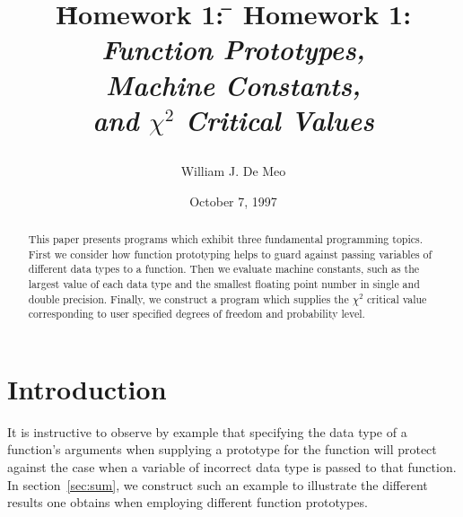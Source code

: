 \documentclass{article}
\begin{document}
\title{
\begin{tabbing}
\=Homework 1: \=\kill 
\>Homework 1: \>\emph{Function Prototypes,}\\
\>\>\emph{Machine Constants,}\\
\>\>\emph{and $\chi^2$ Critical Values}
\end{tabbing}
}
\author{William J. De Meo}
\date{October 7, 1997}
\maketitle

\begin{abstract}
This paper presents programs which exhibit three fundamental 
programming topics.  First we consider how function prototyping 
helps to guard against passing variables of different data types 
to a function.  Then we evaluate 
machine constants, such as the largest value of each data type 
and the smallest floating point number in single and double precision.
Finally, we construct
a program which supplies the $\chi^2$ critical value corresponding
to user specified degrees of freedom and probability level.
\end{abstract}

\section{Introduction}
It is instructive to observe by example that specifying the data
type of a function's arguments when supplying a prototype for the
function will protect against the case when a variable of incorrect
data type is passed to that function.  In section~\ref{sec:sum},
we construct such an example to illustrate the different results 
one obtains when employing different function prototypes.
\end{document}
